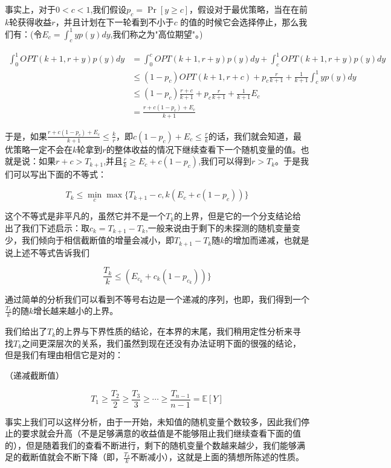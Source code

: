 \documentclass[bachelor]{thuthesis}
\begin{document}
事实上，对于$0<c<1$,我们假设$p_c=\Pr[y\ge c]$，假设对于最优策略，当在在前$k$轮获得收益$r$，并且计划在下一轮看到不小于$c$ 的值的时候它会选择停止，那么我们有：(令$E_c=\int_{c}^{1}yp(y)dy$,我们称之为"高位期望"。)


\begin{align}
\int_{0}^{1}OPT(k+1,r+y)p(y)dy & =\int_{0}^{c}OPT(k+1,r+y)p(y)dy+\int_{c}^{1}OPT(k+1,r+y)p(y)dy\\
                               & \le (1-p_c)OPT(k+1,r+c)+p_c \frac{r}{k+1}+\frac{1}{k+1}\int_{c}^{1}yp(y)dy\\
                               & \le (1-p_c)\frac{r+c}{k+1}+p_c \frac{r}{k+1}+\frac{1}{k+1}E_c\\
                               & = \frac{r+c(1-p_c)+E_c}{k+1}
\end{align}

于是，如果$\frac{r+c(1-p_c)+E_c}{k+1}\le \frac{k}{r}$，即$c(1-p_c)+E_c\le\frac{r}{k}$的话，我们就会知道，最优策略一定不会在$k$轮拿到$r$的整体收益的情况下继续查看下一个随机变量的值。也就是说：如果$r+c>T_{k+1}$,并且$\frac{r}{k}\ge E_c+c(1-p_c)$,我们可以得到$r>T_k$。于是我们可以写出下面的不等式：

\[T_k\le \min_{c}\max\{T_{k+1}-c,k(E_c+c(1-p_c))\}\]

这个不等式是非平凡的，虽然它并不是一个$T_k$的上界，但是它的一个分支结论给出了我们下述启示：取$c_k=T_{k+1}-T_{k}$,一般来说由于剩下的未探测的随机变量变少，我们倾向于相信截断值的增量会减小，即$T_{k+1}-T_k$随$k$的增加而递减，也就是说上述不等式告诉我们

\[\frac{T_k}{k}\le (E_{c_k}+c_k(1-p_{c_k}))\}\]

通过简单的分析我们可以看到不等号右边是一个递减的序列，也即，我们得到一个$\frac{T_k}{k}$的随$k$增长越来越小的上界。

我们给出了$T_k$的上界与下界性质的结论，在本界的末尾，我们稍用定性分析来寻找$T_k$之间更深层次的关系，我们虽然到现在还没有办法证明下面的很强的结论，但是我们有理由相信它是对的：

\begin{conjecture}（递减截断值）

\[T_1\ge \frac{T_2}{2}\ge \frac{T_3}{3}\ge\cdots \ge \frac{T_{n-1}}{n-1}=\mathbb{E}[Y]\]

\end{conjecture}

事实上我们可以这样分析，由于一开始，未知值的随机变量个数较多，因此我们停止的要求就会升高（不是足够满意的收益值是不能够阻止我们继续查看下面的值的），但是随着我们的查看不断进行，剩下的随机变量个数越来越少，我们能够满足的截断值就会不断下降（即，$\frac{T_k}{k}$不断减小），这就是上面的猜想所陈述的性质。
\end{document}
